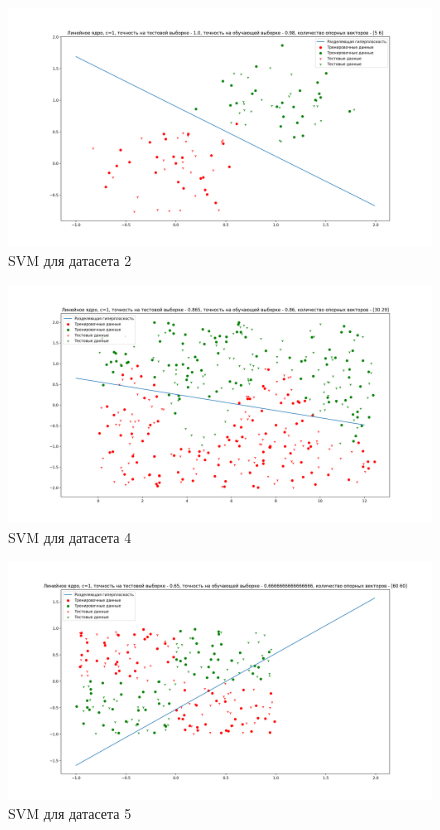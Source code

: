 \documentclass[a4paper,14pt]{article}
\begin{document}
\begin{figure}[H]
\includegraphics[width=\textwidth, keepaspectratio]{task_2c1.png}
\caption{SVM для датасета 2}
\label{graph:task_2c1}
\end{figure}

\begin{figure}[H]
\includegraphics[width=\textwidth, keepaspectratio]{task_4c1.png}
\caption{SVM для датасета 4}
\label{graph:task_4c1}
\end{figure}

\begin{figure}[H]
\includegraphics[width=\textwidth, keepaspectratio]{task_5c1.png}
\caption{SVM для датасета 5}
\label{graph:task_5c1}
\end{figure}
\end{document}
